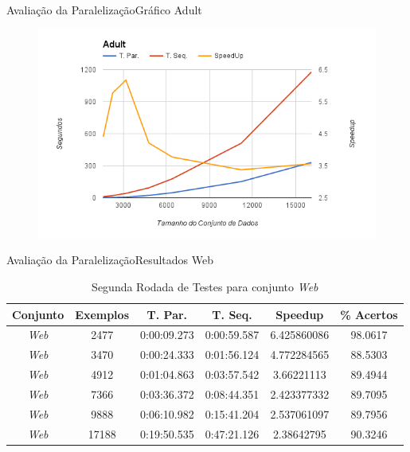 \documentclass{beamer}
\begin{document}
\begin{frame}{Avaliação da Paralelização}{Gráfico Adult}
\begin{figure}
  \centering
  \includegraphics[width=1\textwidth]{GraficoAdult.png}
\end{figure}
\end{frame}

\begin{frame}{Avaliação da Paralelização}{Resultados Web}
\begin{table}
    \caption{Segunda Rodada de Testes para conjunto \emph{Web}}
    \label{tab:bestResults2w}
    \small
    \centering
    \begin{tabular}{|c|c|c|c|c|c|} \hline
		Conjunto & Exemplos & T. Par. & T. Seq. & Speedup & \% Acertos\\ \hline
		\em{Web} & 2477 & 0:00:09.273 & 0:00:59.587 & 6.425860086 & 98.0617\\ \hline
		\em{Web} & 3470 & 0:00:24.333 & 0:01:56.124 & 4.772284565 & 88.5303\\ \hline
		\em{Web} & 4912 & 0:01:04.863 & 0:03:57.542 & 3.66221113 & 89.4944\\ \hline
		\em{Web} & 7366 & 0:03:36.372 & 0:08:44.351 & 2.423377332 & 89.7095\\ \hline
		\em{Web} & 9888 & 0:06:10.982 & 0:15:41.204 & 2.537061097 & 89.7956\\ \hline
		\em{Web} & 17188 & 0:19:50.535 & 0:47:21.126 & 2.38642795 & 90.3246\\ \hline
    \end{tabular}
\end{table}
\end{frame}
\end{document}
